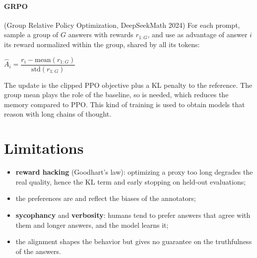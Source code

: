 \paragraph{GRPO} (Group Relative Policy Optimization, DeepSeekMath 2024) For each prompt,
sample a group of $G$ answers with rewards $r_{1:G}$, and use as advantage of
answer $i$ its reward normalized within the group, shared by all its tokens:
\begin{center}
    $\hat{A}_{i}=\dfrac{r_{i}-\mathrm{mean}(r_{1:G})}{\mathrm{std}(r_{1:G})}$
\end{center}
The update is the clipped PPO objective plus a KL penalty to the reference. The group mean
plays the role of the baseline, so  is needed, which reduces the
memory compared to PPO. This kind of training is used to obtain models that reason with long
chains of thought.

\section{Limitations}
\begin{itemize}
    \item \textbf{reward hacking} (Goodhart's law): optimizing a proxy too long degrades the
        real quality, hence the KL term and early stopping on held-out evaluations;
    \item the preferences are  and reflect the biases of the annotators;
    \item \textbf{sycophancy} and \textbf{verbosity}: humans tend to prefer answers that
        agree with them and longer answers, and the model learns it;
    \item the alignment shapes the behavior but gives no guarantee on the truthfulness of
        the answers.
\end{itemize}
